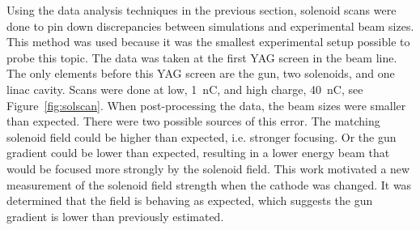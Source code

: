 Using the data analysis techniques in the previous section, 
solenoid scans were done to pin down discrepancies between 
simulations and experimental beam sizes. 
This method was used because it was the smallest experimental 
setup possible to probe this topic.
The data was taken at the first YAG screen in the beam line.
The only elements before this YAG screen are the gun, two solenoids, 
and one linac cavity. 
Scans were done at low, \SI{1}{nC}, and high charge, \SI{40}{nC}, see Figure~\ref{fig:solscan}. 
When post-processing the data, the beam sizes were smaller than expected.
There were two possible sources of this error. 
The matching solenoid field could be higher than expected, i.e. stronger focusing.
Or the gun gradient could be lower than expected, resulting in a lower energy 
beam that would be focused more strongly by the solenoid field.
This work motivated a new measurement of the solenoid field strength when 
the cathode was changed. It was determined that the field is behaving as expected, 
which suggests the gun gradient is lower than previously estimated.
